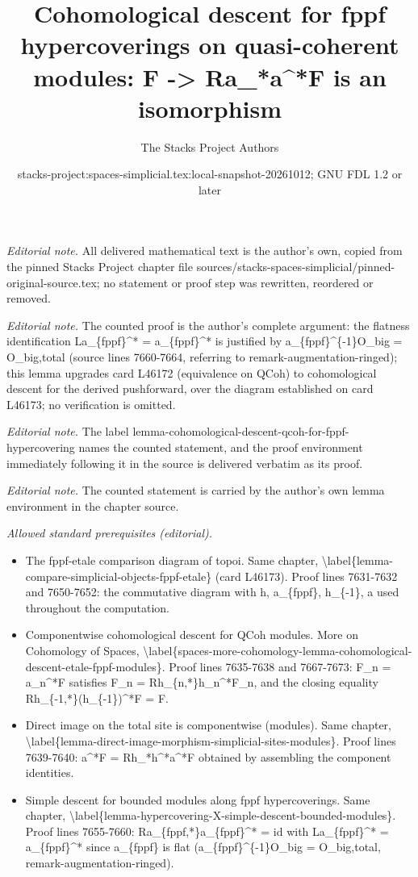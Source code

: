 \documentclass{stacks-project}
\title{Cohomological descent for fppf hypercoverings on quasi-coherent modules: F -> Ra\_*a\textasciicircum{}*F is an isomorphism}
\author{The Stacks Project Authors}
\date{stacks-project:spaces-simplicial.tex:local-snapshot-20261012; GNU FDL 1.2 or later}
\theoremstyle{plain}
\theoremstyle{definition}
\theoremstyle{remark}
\numberwithin{equation}{subsection}
\begin{document}
\maketitle
\noindent\textit{Editorial note.} All delivered mathematical text is the author's own, copied from the pinned Stacks Project chapter file sources/stacks-spaces-simplicial/pinned-original-source.tex; no statement or proof step was rewritten, reordered or removed.\par\medskip
\noindent\textit{Editorial note.} The counted proof is the author's complete argument: the flatness identification La\_\{fppf\}\textasciicircum{}* = a\_\{fppf\}\textasciicircum{}* is justified by a\_\{fppf\}\textasciicircum{}\{-1\}O\_big = O\_big,total (source lines 7660-7664, referring to remark-augmentation-ringed); this lemma upgrades card L46172 (equivalence on QCoh) to cohomological descent for the derived pushforward, over the diagram established on card L46173; no verification is omitted.\par\medskip
\noindent\textit{Editorial note.} The label lemma-cohomological-descent-qcoh-for-fppf-hypercovering names the counted statement, and the proof environment immediately following it in the source is delivered verbatim as its proof.\par\medskip
\noindent\textit{Editorial note.} The counted statement is carried by the author's own lemma environment in the chapter source.\par\medskip
\noindent\textit{Allowed standard prerequisites (editorial).}\begin{itemize}
\item The fppf-etale comparison diagram of topoi. Same chapter, \textbackslash{}label\{lemma-compare-simplicial-objects-fppf-etale\} (card L46173). Proof lines 7631-7632 and 7650-7652: the commutative diagram with h, a\_\{fppf\}, h\_\{-1\}, a used throughout the computation.
\item Componentwise cohomological descent for QCoh modules. More on Cohomology of Spaces, \textbackslash{}label\{spaces-more-cohomology-lemma-cohomological-descent-etale-fppf-modules\}. Proof lines 7635-7638 and 7667-7673: F\_n = a\_n\textasciicircum{}*F satisfies F\_n = Rh\_\{n,*\}h\_n\textasciicircum{}*F\_n, and the closing equality Rh\_\{-1,*\}(h\_\{-1\})\textasciicircum{}*F = F.
\item Direct image on the total site is componentwise (modules). Same chapter, \textbackslash{}label\{lemma-direct-image-morphism-simplicial-sites-modules\}. Proof lines 7639-7640: a\textasciicircum{}*F = Rh\_*h\textasciicircum{}*a\textasciicircum{}*F obtained by assembling the component identities.
\item Simple descent for bounded modules along fppf hypercoverings. Same chapter, \textbackslash{}label\{lemma-hypercovering-X-simple-descent-bounded-modules\}. Proof lines 7655-7660: Ra\_\{fppf,*\}a\_\{fppf\}\textasciicircum{}* = id with La\_\{fppf\}\textasciicircum{}* = a\_\{fppf\}\textasciicircum{}* since a\_\{fppf\} is flat (a\_\{fppf\}\textasciicircum{}\{-1\}O\_big = O\_big,total, remark-augmentation-ringed).
\end{itemize}\medskip
\end{document}
